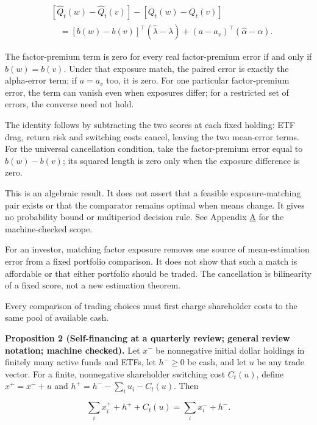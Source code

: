 \documentclass[11pt]{article}
\begin{document}
\begin{equation*}
\begin{aligned}
&[\widehat Q_t(w)-\widehat Q_t(v)]-[Q_t(w)-Q_t(v)]\\
&\quad= [b(w)-b(v)]^\top(\widehat\lambda-\lambda)
       +(a-a_v)^\top(\widehat\alpha-\alpha). 
\end{aligned} \tag{1}\label{eq:1}
\end{equation*}

The factor-premium term is zero for every real factor-premium error if and only if
\(b(w)=b(v)\). Under that exposure match, the paired error is exactly the alpha-error
term; if \(a=a_v\) too, it is zero. For one particular factor-premium error, the term
can vanish even when exposures differ; for a restricted set of errors, the converse
need not hold.

The identity follows by subtracting the two scores at each fixed holding: ETF drag,
return risk and switching costs cancel, leaving the two mean-error terms. For the
universal cancellation condition, take the factor-premium error equal to
\(b(w)-b(v)\); its squared length is zero only when the exposure difference is zero.

This is an algebraic result. It does not
assert that a feasible exposure-matching pair exists or that the comparator remains
optimal when means change. It gives no probability bound or multiperiod decision rule.
See Appendix \hyperref[sec:A]{A} for the machine-checked scope.

For an investor, matching factor exposure removes one source of
mean-estimation error from a fixed portfolio comparison. It does not
show that such a match is affordable or that either portfolio should
be traded. The cancellation is bilinearity of a fixed score, not a
new estimation theorem.

Every comparison of trading choices must first charge shareholder
costs to the same pool of available cash.

\label{res:Proposition-2}
\textbf{Proposition 2 (Self-financing at a quarterly review; general review notation; machine checked).}
Let \(x^-\) be nonnegative initial dollar holdings in finitely many active funds and ETFs,
let \(h^-\geq 0\) be cash, and let \(u\) be any trade vector. For a finite, nonnegative
shareholder switching cost \(C_t(u)\), define \(x^+=x^-+u\) and
\(h^+=h^--\sum_i u_i-C_t(u)\). Then

\begin{equation*}
\sum_i x_i^+ + h^+ + C_t(u)=\sum_i x_i^- + h^-. \tag{2}\label{eq:2}
\end{equation*}
\end{document}
